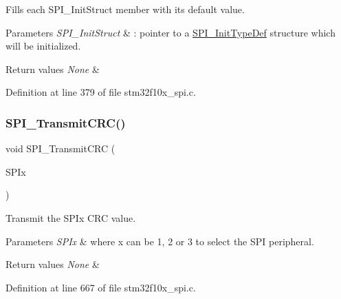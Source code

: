 Fills each S\+P\+I\+\_\+\+Init\+Struct member with its default value. 


\begin{DoxyParams}{Parameters}
{\em S\+P\+I\+\_\+\+Init\+Struct} & \+: pointer to a \hyperlink{struct_s_p_i___init_type_def}{S\+P\+I\+\_\+\+Init\+Type\+Def} structure which will be initialized. \\
\hline
\end{DoxyParams}

\begin{DoxyRetVals}{Return values}
{\em None} & \\
\hline
\end{DoxyRetVals}


Definition at line 379 of file stm32f10x\+\_\+spi.\+c.

\mbox{\label{group___s_p_i___private___functions_gace8b1058e09bab150b0dbe5978810273}} 
\subsubsection{\texorpdfstring{S\+P\+I\+\_\+\+Transmit\+C\+R\+C()}{SPI\_TransmitCRC()}}
{\footnotesize\ttfamily void S\+P\+I\+\_\+\+Transmit\+C\+RC (\begin{DoxyParamCaption}\item[{\hyperlink{struct_s_p_i___type_def}{S\+P\+I\+\_\+\+Type\+Def} $\ast$}]{S\+P\+Ix }\end{DoxyParamCaption})}



Transmit the S\+P\+Ix C\+RC value. 


\begin{DoxyParams}{Parameters}
{\em S\+P\+Ix} & where x can be 1, 2 or 3 to select the S\+PI peripheral. \\
\hline
\end{DoxyParams}

\begin{DoxyRetVals}{Return values}
{\em None} & \\
\hline
\end{DoxyRetVals}


Definition at line 667 of file stm32f10x\+\_\+spi.\+c.

